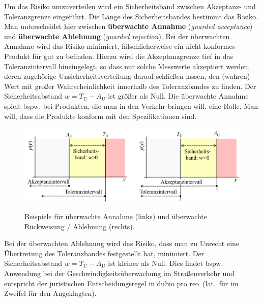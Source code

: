Um das Risiko umzuverteilen wird ein Sicherheitsband zwischen Akzeptanz- und Toleranzgrenze eingeführt. Die Länge des Sicherheitsbandes bestimmt das Risiko. Man unterscheidet hier zwischen \textbf{überwachte Annahme} (\textsl{guarded acceptance})
und \textbf{überwachte Ablehnung} (\textsl{guarded rejection}).
Bei der überwachten Annahme wird das Risiko minimiert, fälschlicherweise ein nicht konformes Produkt für gut zu befinden. Hierzu wird die Akzeptanzgrenze tief in das Toleranzintervall hineingelegt, so dass nur solche Messwerte akzeptiert werden, deren zugehörige Unsicherheitsverteilung darauf schließen lassen, den (wahren) Wert mit großer Wahrscheinlichkeit innerhalb des Toleranzbandes zu finden. Der Sicherheitsabstand $w= 	T_\mathrm{U} - A_\mathrm{U}$ ist größer als Null. Die überwachte Annahme spielt bspw. bei Produkten, die man in den Verkehr bringen will, eine Rolle. Man will, dass die Produkte konform mit den Spezifikationen sind.

\begin{figure}[!htp]
	\begin{center}
	\includegraphics[width=130mm]{05_vorlesung/media/AnnahmeRueckweisungMitToleranz.png}
		\caption{\label{fig:Verteilung_Risiko}} Beispiele für überwachte Annahme (links) und überwachte Rückweisung / Ablehnung (rechts).
	\end{center}
\end{figure}

Bei der überwachten Ablehnung wird das Risiko, dass man zu Unrecht eine Übertretung des Toleranzbandes festgestellt hat, minimiert.
Der Sicherheitsabstand $w= 	T_\mathrm{U} - A_\mathrm{U}$ ist kleiner als Null.
Dies findet bspw. Anwendung bei der Geschwindigkeitsüberwachung im Straßenverkehr und
entspricht der juristischen Entscheidungsregel \glqq in dubio pro reo\grqq ~(lat.\ für \glqq im Zweifel für
den Angeklagten\grqq).


